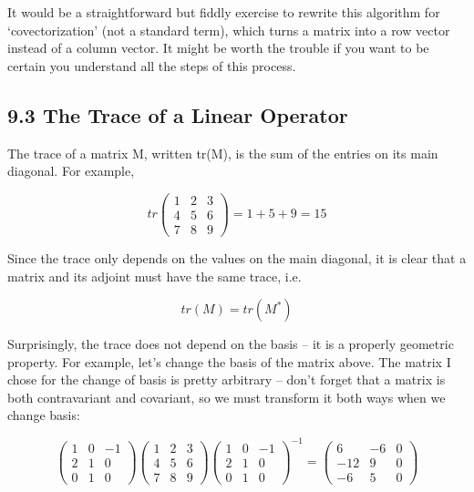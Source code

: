 \documentclass[oneside,english]{amsbook}
\numberwithin{section}{chapter}
\theoremstyle{plain}
\theoremstyle{definition}
\begin{document}
It would be a straightforward but fiddly exercise to rewrite this
algorithm for `covectorization' (not a standard term), which turns a
matrix into a row vector instead of a column vector. It might be worth
the trouble if you want to be certain you understand all the steps of
this process.

\subsection{9.3 The Trace of a Linear
	Operator}\label{the-trace-of-a-linear-operator}

The trace of a matrix M, written tr(M), is the sum of the entries on its
main diagonal. For example,

\[tr\begin{pmatrix}
	1 & 2 & 3 \\
	4 & 5 & 6 \\
	7 & 8 & 9
\end{pmatrix} = 1 + 5 + 9 = 15\]

Since the trace only depends on the values on the main diagonal, it is
clear that a matrix and its adjoint must have the same trace, i.e.

\[tr(M) = tr(M^{*})\]

Surprisingly, the trace does not depend on the basis -- it is a properly
geometric property. For example, let's change the basis of the matrix
above. The matrix I chose for the change of basis is pretty arbitrary --
don't forget that a matrix is both contravariant and covariant, so we
must transform it both ways when we change basis:

\[\begin{pmatrix}
	1 & 0 & - 1 \\
	2 & 1 & 0 \\
	0 & 1 & 0
\end{pmatrix}\begin{pmatrix}
	1 & 2 & 3 \\
	4 & 5 & 6 \\
	7 & 8 & 9
\end{pmatrix}\begin{pmatrix}
	1 & 0 & - 1 \\
	2 & 1 & 0 \\
	0 & 1 & 0
\end{pmatrix}^{- 1} = \begin{pmatrix}
	6 & - 6 & 0 \\
	- 12 & 9 & 0 \\
	- 6 & 5 & 0
\end{pmatrix}\]
\end{document}
